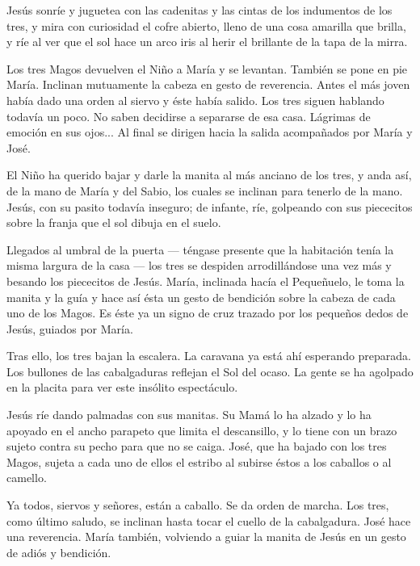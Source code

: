 \documentclass[12pt]{book} %
\begin{document}
Jesús sonríe y juguetea con las cadenitas y las cintas de los indumentos de los tres, y mira con curiosidad el cofre abierto, lleno de una cosa amarilla que brilla, y ríe al ver que el sol hace un arco iris al herir el brillante de la tapa de la mirra. 

Los tres Magos devuelven el Niño a María y se levantan. También se pone en pie María. Inclinan mutuamente la cabeza en gesto de reverencia. Antes el más joven había dado una orden al siervo y éste había salido. Los tres siguen hablando todavía un poco. No saben decidirse a separarse de esa casa. Lágrimas de emoción en sus ojos... Al final se dirigen hacia la salida acompañados por María y José. 

El Niño ha querido bajar y darle la manita al más anciano de los tres, y anda así, de la mano de María y del Sabio, los cuales se inclinan para tenerlo de la mano. Jesús, con su pasito todavía inseguro; de infante, ríe, golpeando con sus piececitos sobre la franja que el sol dibuja en el suelo. 

Llegados al umbral de la puerta — téngase presente que la habitación tenía la misma largura de la casa — los tres se despiden arrodillándose una vez más y besando los piececitos de Jesús. María, inclinada hacía el Pequeñuelo, le toma la manita y la guía y hace así ésta un gesto de bendición sobre la cabeza de cada uno de los Magos. Es éste ya un signo de cruz trazado por los pequeños dedos de Jesús, guiados por María. 

Tras ello, los tres bajan la escalera. La caravana ya está ahí esperando preparada. Los bullones de las cabalgaduras reflejan el Sol del ocaso. La gente se ha agolpado en la placita para ver este insólito espectáculo. 

Jesús ríe dando palmadas con sus manitas. Su Mamá lo ha alzado y lo ha apoyado en el ancho parapeto que limita el descansillo, y lo tiene con un brazo sujeto contra su pecho para que no se caiga. José, que ha bajado con los tres Magos, sujeta a cada uno de ellos el estribo al subirse éstos a los caballos o al camello. 

Ya todos, siervos y señores, están a caballo. Se da orden de marcha. Los tres, como último saludo, se inclinan hasta tocar el cuello de la cabalgadura. José hace una reverencia. María también, volviendo a guiar la manita de Jesús en un gesto de adiós y bendición. 
\end{document}
